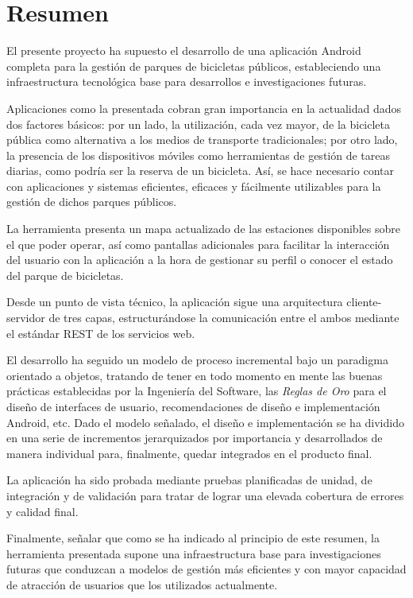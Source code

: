 
\chapter{Resumen}


El presente proyecto ha supuesto el desarrollo de una aplicación Android completa para la gestión de parques de bicicletas públicos, estableciendo una infraestructura tecnológica base para desarrollos e investigaciones futuras. 

Aplicaciones como la presentada cobran gran importancia en la actualidad dados dos factores básicos: por un lado, la utilización, cada vez mayor, de la bicicleta pública como alternativa a los medios de transporte tradicionales; por otro lado, la presencia de los dispositivos móviles como herramientas de gestión de tareas diarias, como podría ser la reserva de un bicicleta. Así, se hace necesario contar con aplicaciones y sistemas eficientes, eficaces y fácilmente utilizables para la gestión de dichos parques públicos.

La herramienta presenta un mapa actualizado de las estaciones disponibles sobre el que poder operar, así como pantallas adicionales para facilitar la interacción del usuario con la aplicación a la hora de gestionar su perfil o conocer el estado del parque de bicicletas.

Desde un punto de vista técnico, la aplicación sigue una arquitectura cliente-servidor de tres capas, estructurándose la comunicación entre el ambos mediante el estándar \textsc{REST} de los servicios web. 

El desarrollo ha seguido un modelo de proceso incremental bajo un paradigma orientado a objetos, tratando de tener en todo momento en mente las buenas prácticas establecidas por la Ingeniería del Software, las \emph{Reglas de Oro} para el diseño de interfaces de usuario, recomendaciones de diseño e implementación Android, etc. Dado el modelo señalado, el diseño e implementación se ha dividido en una serie de incrementos jerarquizados por importancia y desarrollados de manera individual para, finalmente, quedar integrados en el producto final.

La aplicación ha sido probada mediante pruebas planificadas de unidad, de integración y de validación para tratar de lograr una elevada cobertura de errores y calidad final.

Finalmente, señalar que como se ha indicado al principio de este resumen, la herramienta presentada supone una infraestructura base para investigaciones futuras que conduzcan a modelos de gestión más eficientes y con mayor capacidad de atracción de usuarios que los utilizados actualmente.




